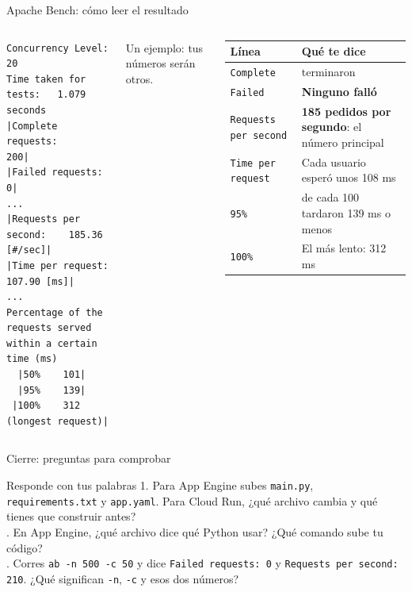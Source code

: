 \documentclass[aspectratio=169,10pt,c]{beamer}
\begin{document}
\begin{frame}[fragile]{Apache Bench: cómo leer el resultado}
\begin{columns}[T,onlytextwidth]
\begin{lstlisting}[style=terminal]
Concurrency Level:      20
Time taken for tests:   1.079 seconds
|Complete requests:      200|
|Failed requests:        0|
...
|Requests per second:    185.36 [#/sec]|
|Time per request:       107.90 [ms]|
...
Percentage of the requests served
within a certain time (ms)
  |50%    101|
  |95%    139|
 |100%    312 (longest request)|
\end{lstlisting}
{\scriptsize Un ejemplo: tus números serán otros.}
\renewcommand{\arraystretch}{1.2}
\small
\begin{tabular}{@{}>{\raggedright\arraybackslash}p{2.3cm}>{\raggedright\arraybackslash}p{3.7cm}@{}}
\toprule
\textbf{Línea} & \textbf{Qué te dice}\\
\midrule
\texttt{Complete} & 200 terminaron\\
\texttt{Failed} & \textcolor{okVerde}{\textbf{Ninguno falló}}\\
\texttt{Requests per second} & \textbf{185 pedidos por segundo}: el número principal\\
\texttt{Time per request} & Cada usuario esperó unos 108 ms\\
\texttt{95\%} & 95 de cada 100 tardaron 139 ms o menos\\
\texttt{100\%} & El más lento: 312 ms\\
\bottomrule
\end{tabular}
\end{columns}
\end{frame}

\begin{frame}{Cierre: preguntas para comprobar}
\begin{block}{Responde con tus palabras}
\small
1. Para App Engine subes \texttt{main.py}, \texttt{requirements.txt} y \texttt{app.yaml}. Para Cloud Run, ¿qué archivo cambia y qué tienes que construir antes?\\. En App Engine, ¿qué archivo dice qué Python usar? ¿Qué comando sube tu código?\\. Corres \texttt{ab -n 500 -c 50} y dice \texttt{Failed requests: 0} y \texttt{Requests per second: 210}. ¿Qué significan \texttt{-n}, \texttt{-c} y esos dos números?
\end{block}
\end{frame}
\end{document}
